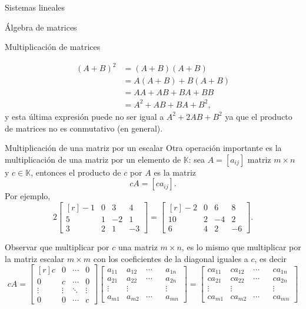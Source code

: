 \documentclass[a4paper,12pt,twoside,spanish]{amsbook}
\theoremstyle{definition}
\theoremstyle{remark}
\newcommand{\K}{\mathbb K}
\begin{document}
\begin{chapter}{Sistemas lineales}
\begin{section}{Álgebra de matrices}
\begin{subsection}{Multiplicación de matrices}
\begin{itemize}
					\begin{align*}
					(A+B)^2 &= (A+B)(A+B) \\&= A(A+B) + B(A+B) \\&= AA + AB + BA + BB \\&= A^2 + AB + BA + B^2,
					\end{align*}
					y  esta última expresión puede no ser  igual a $A^2 + 2AB + B^2$ ya que el producto de matrices no es conmutativo (en general). 
				\end{itemize}
			\end{subsection}
		
		
		\begin{subsection}{Multiplicación de una matriz por un escalar} Otra operación importante es la multiplicación de una matriz por un elemento de $\K$: sea $A=[a_{ij}]$ matriz $m \times n$ y $c \in \K$,  entonces el producto de $c$ por $A$ es la matriz
			$$
			cA=[ca_{ij}].
			$$ 
		Por ejemplo, 
		$$
		2\begin{bmatrix*}[r]
		-1& 0& 3 & 4\\
		5& 1& -2 & 1\\
		3& 2& 1 & -3
		\end{bmatrix*} =
		\begin{bmatrix*}[r]
		-2& 0& 6& 8\\
		10& 2& -4 & 2\\
		6& 4& 2 & -6
		\end{bmatrix*}.
		$$
		
		Observar que multiplicar por $c$ una matriz $m \times n$,  es lo mismo que multiplicar por la matriz escalar $m \times m$ con los coeficientes de la diagonal iguales a $c$,  es decir
		\begin{equation}
			cA = \begin{bmatrix*}[r]
			c     &     0& \cdots & 0\\
			0     &     c& \cdots & 0\\
			\vdots&\vdots&  \ddots      &\vdots\\
			0     &    0  & \cdots & c
			\end{bmatrix*}
			 \begin{bmatrix}
			a_{11}&a_{12}& \cdots & & a_{1n}\\
			a_{21}&a_{22}& \cdots & &a_{2n}\\
			\vdots&\vdots&  & &\vdots\\
			a_{m1}&a_{m2}& \cdots & & a_{mn}
			\end{bmatrix} =
			 \begin{bmatrix}
			ca_{11}&ca_{12}& \cdots & & ca_{1n}\\
			ca_{21}&ca_{22}& \cdots & &ca_{2n}\\
			\vdots&\vdots&  & &\vdots\\
			ca_{m1}&ca_{m2}& \cdots & & ca_{mn}
			\end{bmatrix}
		\end{equation}
		

\end{subsection}
\end{section}
\end{chapter}
\end{document}
